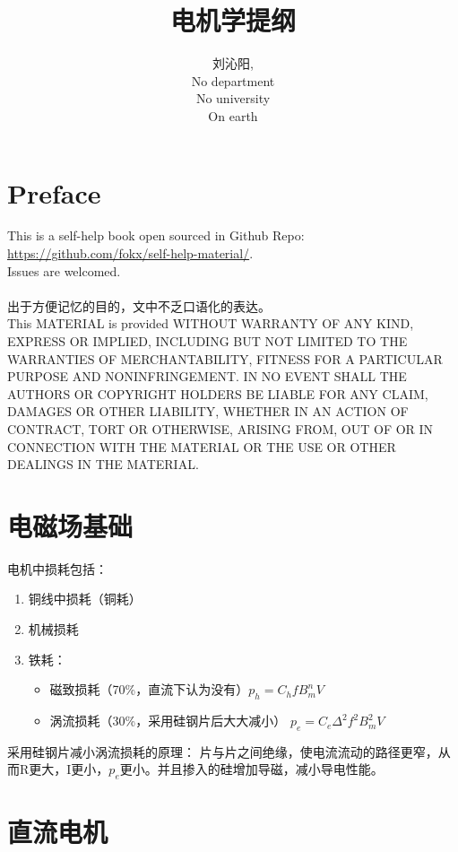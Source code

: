 \documentclass{book}
\title{电机学提纲}
\author{
刘沁阳,\\
No department\\
No university\\
On earth \\
}
\begin{document}
    \maketitle

    \tableofcontents

    \chapter*{Preface}
    This is a self-help book open sourced in Github Repo: \url{https://github.com/fokx/self-help-material/}.\\
    Issues are welcomed.\\\\

    出于方便记忆的目的，文中不乏口语化的表达。\\

    This MATERIAL is provided WITHOUT WARRANTY OF ANY KIND,
    EXPRESS OR IMPLIED,
    INCLUDING BUT NOT LIMITED TO THE WARRANTIES OF MERCHANTABILITY,
    FITNESS FOR A PARTICULAR PURPOSE AND NONINFRINGEMENT.
    IN NO EVENT SHALL THE AUTHORS OR COPYRIGHT HOLDERS BE LIABLE FOR ANY CLAIM,
    DAMAGES OR OTHER LIABILITY, WHETHER IN AN ACTION OF CONTRACT,
    TORT OR OTHERWISE, ARISING FROM,
    OUT OF OR IN CONNECTION WITH THE MATERIAL OR THE USE OR OTHER DEALINGS IN THE MATERIAL.


    \chapter{电磁场基础}
    电机中损耗包括：
    \begin{enumerate}
        \item 铜线中损耗（铜耗）
        \item 机械损耗
        \item 铁耗：
        \begin{itemize}
            \item 磁致损耗（70\%，直流下认为没有）$p_{h}=C_{h} f B_{m}^n V$
            \item 涡流损耗（30\%，采用硅钢片后大大减小） $p_{e}=C_{e} \Delta^2 f^2 B_{m}^2 V$ %
        \end{itemize}
    \end{enumerate}

    采用硅钢片减小涡流损耗的原理：
    片与片之间绝缘，使电流流动的路径更窄，从而R更大，I更小，$p_{e}$更小。并且掺入的硅增加导磁，减小导电性能。


    \chapter{直流电机}
\end{document}
